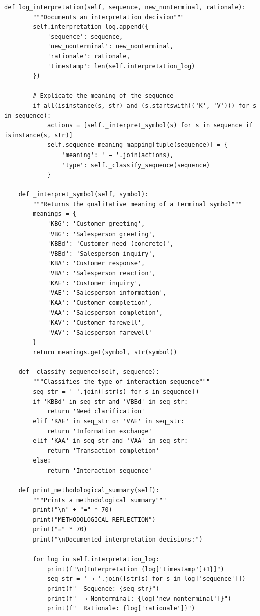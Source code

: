 \documentclass[
  12pt,
  a4paper,
  oneside,
  titlepage
]{article}
\begin{document}
\begin{lstlisting}[caption=Algorithmic Recursive Sequence Analysis 3.0 - Hierarchical Grammar Induction]
    def log_interpretation(self, sequence, new_nonterminal, rationale):
        """Documents an interpretation decision"""
        self.interpretation_log.append({
            'sequence': sequence,
            'new_nonterminal': new_nonterminal,
            'rationale': rationale,
            'timestamp': len(self.interpretation_log)
        })
        
        # Explicate the meaning of the sequence
        if all(isinstance(s, str) and (s.startswith(('K', 'V'))) for s in sequence):
            actions = [self._interpret_symbol(s) for s in sequence if isinstance(s, str)]
            self.sequence_meaning_mapping[tuple(sequence)] = {
                'meaning': ' → '.join(actions),
                'type': self._classify_sequence(sequence)
            }
    
    def _interpret_symbol(self, symbol):
        """Returns the qualitative meaning of a terminal symbol"""
        meanings = {
            'KBG': 'Customer greeting',
            'VBG': 'Salesperson greeting',
            'KBBd': 'Customer need (concrete)',
            'VBBd': 'Salesperson inquiry',
            'KBA': 'Customer response',
            'VBA': 'Salesperson reaction',
            'KAE': 'Customer inquiry',
            'VAE': 'Salesperson information',
            'KAA': 'Customer completion',
            'VAA': 'Salesperson completion',
            'KAV': 'Customer farewell',
            'VAV': 'Salesperson farewell'
        }
        return meanings.get(symbol, str(symbol))
    
    def _classify_sequence(self, sequence):
        """Classifies the type of interaction sequence"""
        seq_str = ' '.join([str(s) for s in sequence])
        if 'KBBd' in seq_str and 'VBBd' in seq_str:
            return 'Need clarification'
        elif 'KAE' in seq_str or 'VAE' in seq_str:
            return 'Information exchange'
        elif 'KAA' in seq_str and 'VAA' in seq_str:
            return 'Transaction completion'
        else:
            return 'Interaction sequence'
    
    def print_methodological_summary(self):
        """Prints a methodological summary"""
        print("\n" + "=" * 70)
        print("METHODOLOGICAL REFLECTION")
        print("=" * 70)
        print("\nDocumented interpretation decisions:")
        
        for log in self.interpretation_log:
            print(f"\n[Interpretation {log['timestamp']+1}]")
            seq_str = ' → '.join([str(s) for s in log['sequence']])
            print(f"  Sequence: {seq_str}")
            print(f"  → Nonterminal: {log['new_nonterminal']}")
            print(f"  Rationale: {log['rationale']}")
            

\end{lstlisting}
\end{document}
